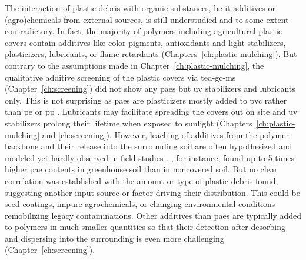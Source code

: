 The interaction of plastic debris with organic substances, be it additives or (agro)\-chemicals from external sources, is still understudied and to some extent contradictory.
In fact, the majority of polymers including agricultural plastic covers contain additives like color pigments, antioxidants and light stabilizers, plasticizers, lubricants, or flame retardants (Chapters~\ref{ch:plastic-mulching}). But contrary to the assumptions made in Chapter~\ref{ch:plastic-mulching}, the qualitative additive screening of the plastic covers via \ac{ted-gc-ms} (Chapter~\ref{ch:screening}) did not show any \acp{pae} but \ac{uv} stabilizers and lubricants only. This is not surprising as \acp{pae} are plasticizers mostly added to \ac{pvc} rather than \ac{pe} or \ac{pp} \citep{WaltersPlasticizers2020}. Lubricants may facilitate spreading the covers out on site and \ac{uv} stabilizers prolong their lifetime when exposed to sunlight (Chapters~\ref{ch:plastic-mulching} and \ref{ch:screening}).
However, leaching of additives from the polymer backbone and their release into the surrounding soil are often hypothesized \citep[Chapter~\ref{ch:plastic-mulching};][]{PathanSoil2020,ZhangTransport2020} and modeled \citep{ZhangAgricultural2021} yet hardly observed in field studies \citep{QiBehavior2020}.
, for instance, found up to \num{5} times higher \ac{pae} contents in greenhouse soil than in noncovered soil. But no clear correlation was established with the amount or type of plastic debris found, suggesting another input source or factor driving their distribution. This could be seed coatings, impure agrochemicals, or changing environmental conditions remobilizing legacy contaminations.
Other additives than \acp{pae} are typically added to polymers in much smaller quantities \citep{HahladakisOverview2018} so that their detection after desorbing and dispersing into the surrounding is even more challenging (Chapter~\ref{ch:screening}).

